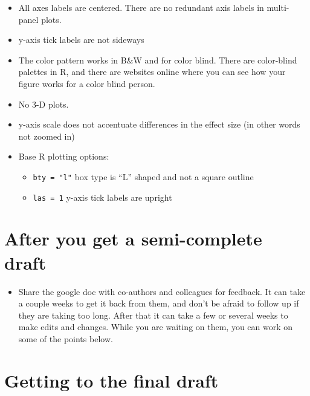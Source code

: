 \documentclass[
  letterpaper,
  DIV=11,
  numbers=noendperiod]{scrreprt}
\providecommand{\tightlist}{%
  \setlength{\itemsep}{0pt}\setlength{\parskip}{0pt}}\usepackage{longtable,booktabs,array}
\begin{document}
\begin{itemize}
\item
  All axes labels are centered. There are no redundant axis labels in
  multi-panel plots.
\item
  y-axis tick labels are not sideways
\item
  The color pattern works in B\&W and for color blind. There are
  color-blind palettes in R, and there are websites online where you can
  see how your figure works for a color blind person.
\item
  No 3-D plots.
\item
  y-axis scale does not accentuate differences in the effect size (in
  other words not zoomed in)
\item
  Base R plotting options:

  \begin{itemize}
  \item
    \texttt{bty\ =\ "l"} box type is ``L'' shaped and not a square
    outline
  \item
    \texttt{las\ =\ 1} y-axis tick labels are upright
  \end{itemize}
\end{itemize}

\hypertarget{after-you-get-a-semi-complete-draft}{%
\section*{\texorpdfstring{\textbf{After you get a semi-complete
draft}}{After you get a semi-complete draft}}\label{after-you-get-a-semi-complete-draft}}

\begin{itemize}
\tightlist
\item
  Share the google doc with co-authors and colleagues for feedback. It
  can take a couple weeks to get it back from them, and don't be afraid
  to follow up if they are taking too long. After that it can take a few
  or several weeks to make edits and changes. While you are waiting on
  them, you can work on some of the points below.
\end{itemize}

\hypertarget{getting-to-the-final-draft}{%
\section*{\texorpdfstring{\textbf{Getting to the final
draft}}{Getting to the final draft}}\label{getting-to-the-final-draft}}
\end{document}
